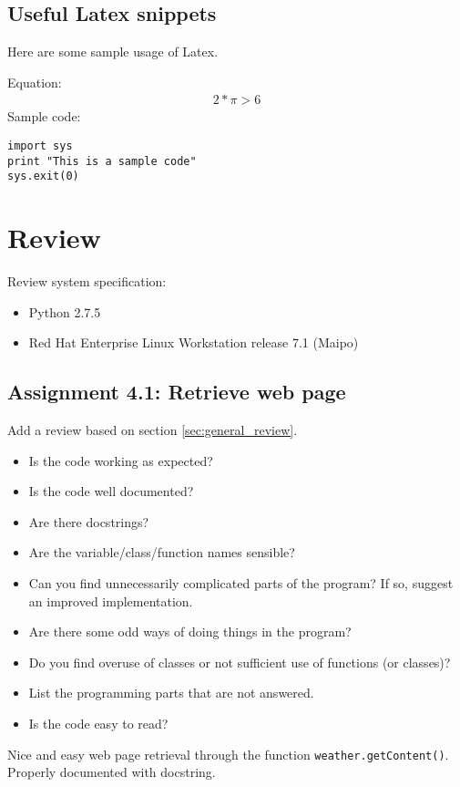 \documentclass[a4paper]{article}
\begin{document}
\subsection{Useful Latex snippets}
Here are some sample usage of Latex.

\noindent
Equation:
\begin{align}
2 * \pi > 6
\end{align}
Sample code:

\begin{verbatim}
import sys
print "This is a sample code"
sys.exit(0)
\end{verbatim}

\section{Review}\label{sec:review}
Review system specification:
\begin{itemize}
	\item Python 2.7.5
    \item Red Hat Enterprise Linux Workstation release 7.1 (Maipo)
\end{itemize}

\subsection*{Assignment 4.1: Retrieve web page}
Add a review based on section \ref{sec:general_review}.
\begin{itemize}
  \item Is the code working as expected?   
  \item Is the code well documented?
  \item Are there docstrings?
  \item Are the variable/class/function names sensible?
  \item Can you find unnecessarily complicated parts of the program? If so, suggest an improved implementation.
  \item Are there some odd ways of doing things in the program?
  \item Do you find overuse of classes or not sufficient use of functions (or
    classes)?
  \item List the programming parts that are not answered.    
  \item Is the code easy to read?
\end{itemize}
Nice and easy web page retrieval through the function \texttt{weather.getContent()}. Properly documented with docstring.
\end{document}
